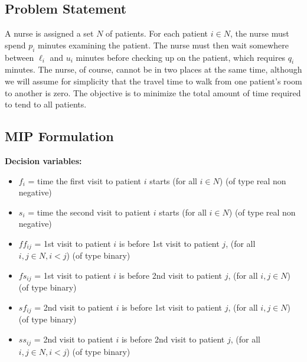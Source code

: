 \documentclass[a4paper,10pt]{article}
\begin{document}
\subsection*{Problem Statement}
A nurse is assigned a set $N$ of patients. For each patient $i \in N$, the nurse must spend $p_i$ minutes examining the patient. The nurse must then wait somewhere between $\ell_i$ and $u_i$ minutes before checking up on the patient, which requires $q_i$ minutes. The nurse, of course, cannot be in two places at the same time, although we will assume for simplicity that the travel time to walk from one patient's room to another is zero. The objective is to minimize the total amount of time required to tend to all patients.

\subsection*{MIP Formulation}

\textbf{Decision variables:}

\begin{itemize}
  \item \(f_i\) = time the first visit to patient \(i\) starts (for all \(i \in N\)) (of type real non negative)
  \item \(s_i\) = time the second visit to patient \(i\) starts (for all \(i \in N\)) (of type real non negative)
  
  \item \(ff_{ij}\) = 1st visit to patient \(i\) is before 1st visit to patient \(j\), (for all \(i, j \in N, i < j\)) (of type binary) 
  \item \(fs_{ij}\) = 1st visit to patient \(i\) is before 2nd visit to patient \(j\), (for all \(i, j \in N\)) (of type binary)
  \item \(sf_{ij}\) = 2nd visit to patient \(i\) is before 1st visit to patient \(j\), (for all \(i, j \in N\)) (of type binary)
  \item \(ss_{ij}\) = 2nd visit to patient \(i\) is before 2nd visit to patient \(j\), (for all \(i, j \in N, i < j\)) (of type binary)
\end{itemize}
\end{document}
